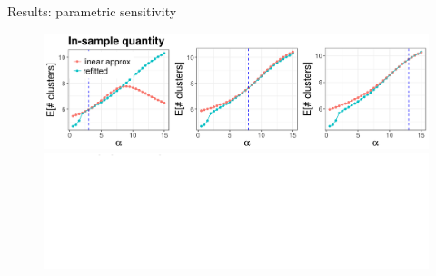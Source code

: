 \documentclass[10pt]{beamer}\usepackage[]{graphicx}\usepackage[]{color}
\newenvironment{knitrout}{}{} %
\begin{document}
\begin{frame}{Results: parametric sensitivity}

\begin{figure}
\centering
\begin{knitrout}
\color{fgcolor}

{\centering \includegraphics[width=0.98\linewidth,height=0.294\linewidth]{figure/param_sens_plot_thresh_0-1} 

}



\end{knitrout}
\begin{knitrout}
\color{fgcolor}

{\centering \includegraphics[width=0.98\linewidth,height=0.294\linewidth]{masked_results_fig/param_sens_plot_thresh_0b_masked-1} 

}



\end{knitrout}
\end{figure}


\end{frame}
\end{document}
